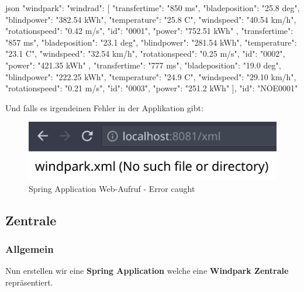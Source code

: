 \begin{code}{json}
    {"windpark": {
        "windrad": [
            {
                "transfertime": "850 ms",
                "bladeposition": "25.8 deg",
                "blindpower": "382.54 kWh",
                "temperature": "25.8 C",
                "windspeed": "40.54 km/h",
                "rotationspeed": "0.42 m/s",
                "id": "0001",
                "power": "752.51 kWh"
            },
            {
                "transfertime": "857 ms",
                "bladeposition": "23.1 deg",
                "blindpower": "281.54 kWh",
                "temperature": "23.1 C",
                "windspeed": "32.54 km/h",
                "rotationspeed": "0.25 m/s",
                "id": "0002",
                "power": "421.35 kWh"
            },
            {
                "transfertime": "777 ms",
                "bladeposition": "19.0 deg",
                "blindpower": "222.25 kWh",
                "temperature": "24.9 C",
                "windspeed": "29.10 km/h",
                "rotationspeed": "0.21 m/s",
                "id": "0003",
                "power": "251.2 kWh"
            }
        ],
        "id": "NOE0001"
    }}
\end{code}

Und falls es irgendeinen Fehler in der Applikation gibt:

\begin{figure}
    \caption{Spring Application Web-Aufruf - Error caught}
    \includegraphics[width=15cm]{images/spring-app-filenotfound}
    \centering
\end{figure}


\clearpage
\subsection{Zentrale}

\subsubsection{Allgemein}

Nun erstellen wir eine \textbf{Spring Application} welche eine \textbf{Windpark Zentrale} repräsentiert.

